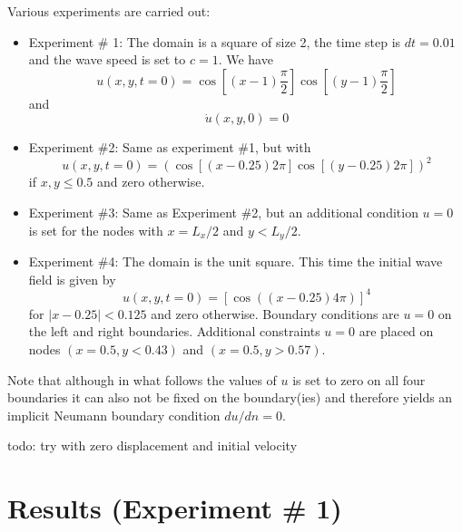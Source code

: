 Various experiments are carried out:
\begin{itemize}
\item Experiment \# 1:
The domain is a square of size 2, the time step is $dt=0.01$
and the wave speed is set to $c=1$. We have
\[
u(x,y,t=0)=\cos\left[ (x-1)\frac{\pi}{2}\right] \cos\left[ (y-1)\frac{\pi}{2} \right]
\]
and 
\[
\dot{u}(x,y,0)=0
\]
\item Experiment \#2:
Same as experiment \#1, but with
\[
u(x,y,t=0)=\left( \cos\left[ (x-0.25) 2\pi\right] \cos\left[ (y-0.25)2 \pi \right] \right)^2
\]
if $x,y \le 0.5$ and zero otherwise.

\item Experiment \#3:
Same as Experiment \#2, but an additional condition $u=0$ is set for the nodes with $x=L_x/2$
and $y<L_y/2$.

\item Experiment \#4:
The domain is the unit square.
This time the initial wave field is given by 
\[
u(x,y,t=0)=\left[\cos\left( (x-0.25)4 \pi \right)\right]^4
\]
for $|x-0.25|<0.125$ and zero otherwise.
Boundary conditions are $u=0$ on the left and right boundaries.
Additional constraints $u=0$ are placed on nodes $(x=0.5,y<0.43)$
and $(x=0.5,y>0.57)$.

\end{itemize}

Note that although in what follows the values of $u$ is set to zero 
on all four boundaries it can also not be fixed on the boundary(ies)
and therefore yields an implicit Neumann boundary condition $du/dn=0$.

todo: try with zero displacement and initial velocity

\section*{Results (Experiment \# 1)}

